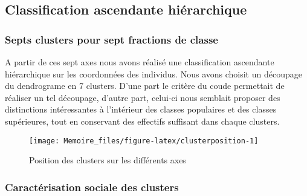 \documentclass[
  12pt,
]{book}
\begin{document}
\subsection{Classification ascendante
hiérarchique}\label{classification-ascendante-hiuxe9rarchique}

\subsubsection{Septs clusters pour sept fractions de
classe}\label{septs-clusters-pour-sept-fractions-de-classe}

A partir de ces sept axes nous avons réalisé une classification
ascendante hiérarchique sur les coordonnées des individus. Nous avons
choisit un découpage du dendrograme en 7 clusters. D'une part le critère
du coude permettait de réaliser un tel découpage, d'autre part, celui-ci
nous semblait proposer des distinctions intéressantes à l'intérieur des
classes populaires et des classes supérieures, tout en conservant des
effectifs suffisant dans chaque clusters.

\begin{figure}[h]

{\centering \texttt{[image: Memoire\_files/figure-latex/clusterposition-1]} 

}

\caption{Position des clusters sur les différents axes}\label{fig:clusterposition}
\end{figure}

\subsubsection{Caractérisation sociale des
clusters}\label{caractuxe9risation-sociale-des-clusters}
\end{document}
